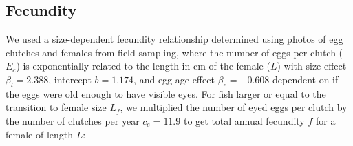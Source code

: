 \documentclass[12pt, oneside]{article}   	%
\begin{document}





\subsection{Fecundity} \label{APP_SEC_METHODS_Fecundity}

We used a size-dependent fecundity relationship determined using photos of egg clutches and females from field sampling, where the number of eggs per clutch ($E_c$) is exponentially related to the length in cm of the female ($L$) with size effect $\beta_l = 2.388$, intercept $b = 1.174$, and egg age effect $\beta_e = -0.608$ dependent on if the eggs were old enough to have visible eyes. For fish larger or equal to the transition to female size $L_f$, we multiplied the number of eyed eggs per clutch by the number of clutches per year $c_e = 11.9$ \citep[estimate from][]{holtswarth2017fecundity} to get total annual fecundity $f$ for a female of length $L$:
\end{document}
